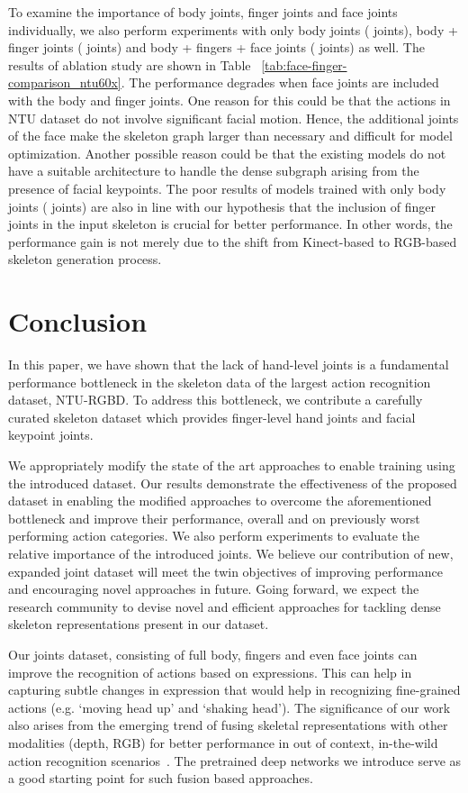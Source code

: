 \documentclass[sigconf,screen,prologue,table,dvipsnames]{acmart}
\begin{document}
To examine the importance of body joints, finger joints and face joints individually, we also perform experiments with only body joints ( joints), body + finger joints ( joints) and body + fingers + face joints ( joints) as well. The results of ablation study are shown in Table ~\ref{tab:face-finger-comparison_ntu60x}. The performance degrades when face joints are included with the body and finger joints. One reason for this could be that the actions in NTU dataset do not involve significant facial motion. Hence, the additional joints of the face make the skeleton graph larger than necessary and difficult for model optimization. Another possible reason could be that the existing models do not have a suitable architecture to handle the dense subgraph arising from the presence of facial keypoints. The poor results of models trained with only body joints ( joints) are also in line with our hypothesis that the inclusion of finger joints in the input skeleton is crucial for better performance. In other words, the performance gain is not merely due to the shift from Kinect-based to RGB-based skeleton generation process.

\section{Conclusion}
\label{sec:conclusion}

In this paper, we have shown that the lack of hand-level joints is a fundamental performance bottleneck in the skeleton data of the largest action recognition dataset, NTU-RGBD. To address this bottleneck, we contribute a carefully curated skeleton dataset which provides finger-level hand joints and facial keypoint joints. 

We appropriately modify the state of the art approaches to enable training using the introduced dataset. Our results demonstrate the effectiveness of the proposed dataset in enabling the modified approaches to overcome the aforementioned bottleneck and improve their performance, overall and on previously worst performing action categories. We also perform experiments to evaluate the relative importance of the introduced joints. We believe our contribution of new, expanded joint dataset will meet the twin objectives of improving performance and encouraging novel approaches in future. Going forward, we expect the research community to devise novel and efficient approaches for tackling dense skeleton representations present in our dataset. 

Our  joints dataset, consisting of full body, fingers and even face joints can improve the recognition of actions based on expressions. This can help in capturing subtle changes in expression that would help in recognizing fine-grained actions (e.g. `moving head up' and `shaking head'). The significance of our work also arises from the emerging trend of fusing skeletal representations with other modalities (depth, RGB) for better performance in out of context, in-the-wild action recognition scenarios~\cite{mimetics, Gupta2021, moon2021integralaction}. The pretrained deep networks we introduce serve as a good starting point for such fusion based approaches.
\end{document}
